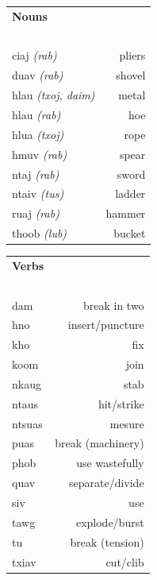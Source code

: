 \documentclass{article}
\begin{document}
\begin{multicols}{2}
[
\section*{}
\begin{center}\rule{\textwidth}{.4pt}\end{center}
]

\begin{tabular}{l r}
\textbf{Nouns} \\
~\\
ciaj {\em (rab)} &pliers\\
duav {\em (rab)} &shovel\\
hlau {\em (txoj, daim)} &metal\\
hlau {\em (rab)} &hoe\\
hlua {\em (txoj)} &rope\\
hmuv {\em (rab)} &spear\\
ntaj {\em (rab)} &sword\\
ntaiv {\em (tus)} &ladder\\
ruaj {\em (rab)} &hammer\\
thoob {\em (lub)} &bucket\\
\end{tabular}

\begin{tabular}{l r}
\textbf{Verbs} \\
~\\
dam &break in two\\
hno &insert/puncture\\
kho &fix\\
koom &join\\
nkaug &stab\\
ntaus &hit/strike\\
ntsuas &mesure\\
puas &break (machinery)\\
phob &use wastefully\\
quav &separate/divide\\
siv &use\\
tawg &explode/burst\\
tu &break (tension)\\
txiav &cut/clib\\
\end{tabular}
\end{multicols}

\clearpage
\end{document}
